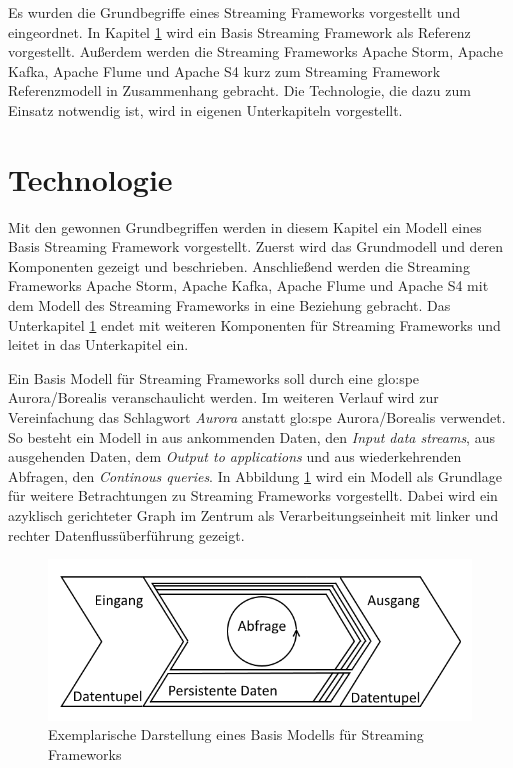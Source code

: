 Es wurden die Grundbegriffe eines Streaming Frameworks vorgestellt und eingeordnet. In Kapitel \ref{section:technologie} wird ein Basis Streaming Framework als Referenz vorgestellt. Außerdem werden die Streaming Frameworks Apache Storm, Apache Kafka, Apache Flume und Apache S4 kurz zum Streaming Framework Referenzmodell in Zusammenhang gebracht. Die Technologie, die dazu zum Einsatz notwendig ist, wird in eigenen Unterkapiteln vorgestellt.

\section{Technologie}
\label{section:technologie}

Mit den gewonnen Grundbegriffen werden in diesem Kapitel ein Modell eines Basis Streaming Framework vorgestellt. Zuerst wird das Grundmodell und deren Komponenten gezeigt und beschrieben. Anschließend werden die Streaming Frameworks Apache Storm, Apache Kafka, Apache Flume und Apache S4 mit dem Modell des Streaming Frameworks in eine Beziehung gebracht. Das Unterkapitel \ref{section:technologie} endet mit weiteren Komponenten für Streaming Frameworks und leitet in das Unterkapitel  ein.


Ein Basis Modell für Streaming Frameworks soll durch eine \gls{glo:spe} Aurora/Borealis  veranschaulicht werden. Im weiteren Verlauf wird zur Vereinfachung das Schlagwort \textit{Aurora} anstatt \gls{glo:spe} Aurora/Borealis verwendet. So besteht ein Modell in  aus ankommenden Daten, den \textit{Input data streams}, aus ausgehenden Daten, dem \textit{Output to applications} und aus wiederkehrenden Abfragen, den \textit{Continous queries}. In Abbildung \ref{fig:basismodell} wird ein Modell als Grundlage für weitere Betrachtungen zu Streaming Frameworks vorgestellt. Dabei wird ein azyklisch gerichteter Graph im Zentrum als Verarbeitungseinheit mit linker und rechter Datenflussüberführung gezeigt.

\begin{figure}[htb!]
\centering
\includegraphics[width=1.0\textwidth]{bilder/StreamingFrameworkBasisModell.png}
\caption{Exemplarische Darstellung eines Basis Modells für Streaming Frameworks
\label{fig:basismodell}}
\end{figure}

